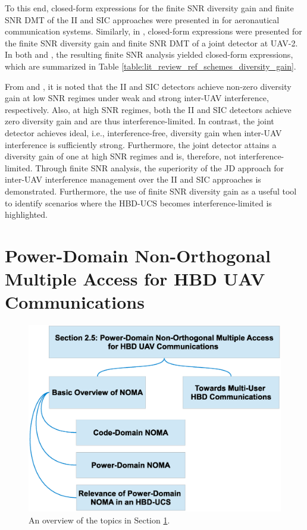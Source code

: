 To this end, closed-form expressions for the finite SNR diversity gain and finite SNR DMT of the II and SIC approaches were presented in \cite{ernest2019outage} for aeronautical communication systems. Similarly, in \cite{tan2018joint}, closed-form expressions were presented for the finite SNR diversity gain and finite SNR DMT of a joint detector at UAV-2. In both \cite{ernest2019outage} and \cite{tan2018joint}, the resulting finite SNR analysis yielded closed-form expressions, which are summarized in Table \ref{table:lit_review_ref_schemes_diversity_gain}. 

From \cite[Fig. 3]{tan2018joint} and \cite[Fig. 5]{tan2018joint}, it is noted that the II and SIC detectors achieve non-zero diversity gain at low SNR regimes under weak and strong inter-UAV interference, respectively. Also, at high SNR regimes, both the II and SIC detectors achieve zero diversity gain and are thus interference-limited. In contrast, the joint detector achieves ideal, i.e., interference-free, diversity gain when inter-UAV interference is sufficiently strong. Furthermore, the joint detector attains a diversity gain of one at high SNR regimes and is, therefore, not interference-limited. Through finite SNR analysis, the superiority of the JD approach for inter-UAV interference management over the II and SIC approaches is demonstrated. Furthermore, the use of finite SNR diversity gain as a useful tool to identify scenarios where the HBD-UCS becomes interference-limited is highlighted.

\section{Power-Domain Non-Orthogonal Multiple Access for HBD UAV Communications} \label{lit_review_sec_noma}

\begin{figure} [tpb]
\centering
\includegraphics [width=0.7\columnwidth]{chap2_fig/sec_5_taxonomy.eps} 
\vspace{-0.5cm}
\caption{An overview of the topics in Section \ref{lit_review_sec_noma}.}
\label{fig:lit_review_sec_5_taxonomy}
\end{figure}

